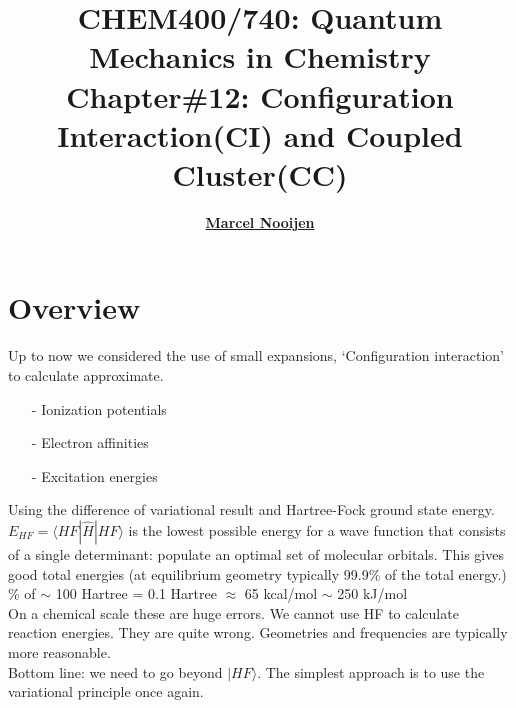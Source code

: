\documentclass[a4paper, 12pt]{article}
\begin{document}
\title{\bf {CHEM400/740: Quantum Mechanics in Chemistry\\ Chapter\#12: Configuration Interaction(CI) and Coupled Cluster(CC)}} \author{\bf
  \href{http://scienide2.uwaterloo.ca/~nooijen/website_new_20_10_2011/About.html}{Marcel Nooijen}} \date{}
  
\pagestyle{fancy} \fancyhead[L]{\textcolor{PrimaryColor}{CHEM400/740: Quantum Mechanics in Chemistry}} \fancyhead[R]{\textcolor{PrimaryColor}{2021 Winter}}


\maketitle
\tableofcontents

\clearpage


\section{Overview} 
Up to now we considered the use of small expansions, `Configuration interaction' to calculate approximate.
\begin{itemize}
	\item [-] Ionization potentials
	\item [-] Electron affinities
	\item [-] Excitation energies
\end{itemize}
\tab Using the difference of variational result and Hartree-Fock ground state energy. $E_{HF} = \langle HF|\hat{H}|HF\rangle $ is the lowest possible energy for a wave function that consists of a single determinant: populate an optimal set of molecular orbitals. This gives good total energies (at equilibrium geometry typically 99.9\% of the total energy.)\\
\% of $\sim$ 100 Hartree = 0.1 Hartree $\approx$ 65 kcal/mol $\sim$ 250 kJ/mol \\
\tab On a chemical scale these are huge errors. We cannot use HF to calculate reaction energies. They are quite wrong. Geometries and frequencies are typically more reasonable.\\
\tab Bottom line: we need to go beyond $|HF\rangle$. The simplest approach is to use the variational principle once again. 
\end{document}
